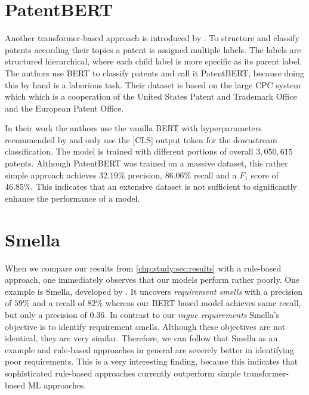\section{PatentBERT}
Another transformer-based approach is introduced by \textcite{Lee:2019}.
To structure and classify patents according their topics a patent is assigned multiple labels.
The labels are structured hierarchical, where each child label is more specific as its parent label.
The authors use \ac{BERT} to classify patents and call it PatentBERT, because doing this by hand is a laborious task.
Their dataset is based on the large \ac{CPC} system which which is a cooperation of the United States Patent and Trademark Office and the European Patent Office.

In their work the authors use the vanilla \ac{BERT} with hyperparameters recommended by \textcite{Devlin:2018} and only use the [CLS] output token for the downstream classification.
The model is trained with different portions of overall $3,050,615$ patents.
Although PatentBERT was trained on a massive dataset, this rather simple approach achieves $32.19\%$ precision, $86.06\%$ recall and a $F_1$ score of $46.85\%$.
This indicates that an extensive dataset is not sufficient to significantly enhance the performance of a model.

\section{Smella}
When we compare our results from \cref{chp:study:sec:results} with a rule-based approach, one immediately observes that our models perform rather poorly.
One example is Smella, developed by \textcite{Femmer:2017}.
It uncovers \textit{requirement smells} with a precision of $59\%$ and a recall of $82\%$ whereas our \ac{BERT} based model achieves same recall, but only a precision of $0.36$.
In contrast to our \textit{vague requirements} Smella's objective is to identify requirement smells.
Although these objectives are not identical, they are very similar.
Therefore, we can follow that Smella as an example and rule-based approaches in general are severely better in identifying poor requirements.
This is a very interesting finding, because this indicates that sophisticated rule-based approaches currently outperform simple transformer-based \ac{ML} approaches.

